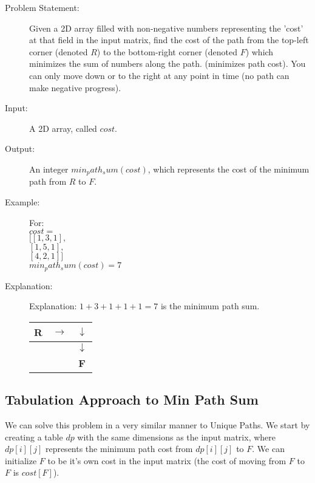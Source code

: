\begin{description}
    \item[Problem Statement:]
        Given a 2D array filled with non-negative numbers representing the 'cost' at that field in the input matrix,
        find the cost of the path from the top-left corner (denoted $R$) to the bottom-right corner (denoted $F$) which minimizes the sum of numbers along the path.
        (minimizes path cost).
        You can only move down or to the right at any point in time (no path can make negative progress).

    \item[Input:]
        A 2D array, called $cost$.
        
    \item[Output:]
        An integer $min_path_sum(cost)$, which represents the cost of the minimum path from $R$ to $F$.
        
    \item[Example:] For:\\
    $cost = $\\
    $[[1,3,1],$\\
    $[1,5,1],$\\
    $[4,2,1]]$\\

    $min_path_sum(cost) = 7$

    \item[Explanation:]
        Explanation: $1 + 3 + 1 + 1 + 1 = 7$ is the minimum path sum.
        \begin{table}[H]
            \centering
            \begin{tabular}{|c|c|c|}
                \hline
                \textbf{R} & $\rightarrow$ & $\downarrow$ \\
                \hline
                 &  & $\downarrow$ \\
                \hline
                 &  & \textbf{F} \\
                \hline
            \end{tabular}
        \end{table}
        
\end{description}

\subsection{Tabulation Approach to Min Path Sum}
We can solve this problem in a very similar manner to Unique Paths.
We start by creating a table $dp$ with the same dimensions as the input matrix, where $dp[i][j]$ represents the minimum path cost from $dp[i][j]$ to $F$.
We can initialize $F$ to be it's own cost in the input matrix (the cost of moving from $F$ to $F$ is $cost[F]$).

